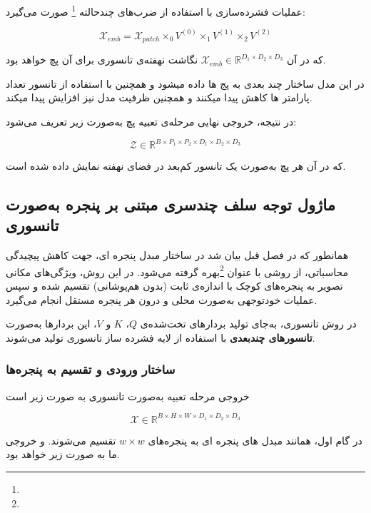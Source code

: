عملیات فشرده‌سازی با استفاده از ضرب‌های چندحالته \footnote{} صورت می‌گیرد:

\begin{equation}
	\mathcal{X}_{emb} = \mathcal{X}_{patch} \times_0 V^{(0)} \times_1 V^{(1)} \times_2 V^{(2)}
\end{equation}


که در آن $\mathcal{X}_{emb} \in \mathbb{R}^{D_1 \times D_2 \times D_3}$ نگاشت نهفته‌ی تانسوری برای آن پچ خواهد بود.

در این مدل ساختار چند بعدی به پج ها داده میشود و همچنین با استفاده از تانسور تعداد پارامتر ها کاهش پیدا میکنند و همچنین ظرفیت مدل نیز افزایش پیدا میکند.




در نتیجه، خروجی نهایی مرحله‌ی تعبیه پچ به‌صورت زیر تعریف می‌شود:

\[
\mathcal{Z} \in \mathbb{R}^{B \times P_1 \times P_2 \times D_1 \times D_2 \times D_3}
\]

که در آن هر پچ به‌صورت یک تانسور کم‌بعد در فضای نهفته نمایش داده شده است.


\subsection{ماژول توجه سلف چندسری مبتنی بر پنجره به‌صورت تانسوری}

همانطور که در فصل قبل بیان شد در ساختار مبدل پنجره ای، جهت کاهش پیچیدگی محاسباتی، از روشی با عنوان  \footnote{}بهره گرفته می‌شود. در این روش، ویژگی‌های مکانی تصویر به پنجره‌های کوچک با اندازه‌ی ثابت (بدون هم‌پوشانی) تقسیم شده و سپس عملیات  خود‌توجهی به‌صورت محلی و درون هر پنجره مستقل انجام می‌گیرد.

در روش تانسوری، به‌جای تولید بردارهای تخت‌شده‌ی $Q$، $K$ و $V$، این بردارها به‌صورت \textbf{تانسورهای چندبعدی} با استفاده از لایه فشرده ساز تانسوری تولید می‌شوند.

\subsubsection*{ ساختار ورودی و تقسیم به پنجره‌ها}

خروجی مرحله تعبیه  به‌صورت تانسوری به صورت زیر است 

\[
\mathcal{X} \in \mathbb{R}^{B \times H \times W \times D_1 \times D_2 \times D_3}
\]



در گام اول، همانند مبدل های پنجره ای به پنجره‌های $w \times w$ تقسیم می‌شوند. و خروجی ما به صورت  زیر خواهد بود.

